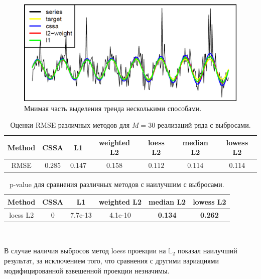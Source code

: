 \documentclass[specialist,
               substylefile = spbu.rtx,
               subf,href,colorlinks=true, 12pt]{disser}
\begin{document}
\begin{figure}[H]
	\begin{center}
		\includegraphics[width=0.67\linewidth]{img/analys_1_Im.png}
	\end{center}
	\caption{Мнимая часть выделения тренда несколькими способами.}
	\label{analys_Im_1}
\end{figure}

\begin{table}[H]
	\begin{center}
		\caption{Оценки RMSE различных методов для $M = 30$ реализаций ряда с выбросами.}
		\label{tab2}
		\begin{tabular}{|c|c|c|c|c|c|c|}
			\hline
			Method 	& CSSA & L1 & weighted L2 & loess L2 & median L2 & lowess L2 \\ 
			\hline
			RMSE & 0.285  & 0.147  & 0.158 & $\mathbf{0.112}$ & 0.114 & 0.114\\
			\hline
		\end{tabular}
	\end{center}
\end{table}

\begin{table}[H]
	\caption{p-value для сравнения различных методов с наилучшим с выбросами.}
	\label{tab: pval2}
	\begin{center}
		\begin{tabular}{|c|c|c|c|c|c|}
			\hline
			Method & CSSA	& L1 & weighted L2 & median L2 & lowess L2  \\ 
			\hline
			loess L2 & 0  & 7.7e-13 &   4.1e-10  &  \textbf{0.134} & \textbf{0.262}  \\
			\hline
		\end{tabular} \\
	\end{center}
\end{table}

В случае наличия выбросов метод loess проекции на $\mathbb{L}_2$ показал наилучший результат, за исключением того, что сравнения с другими вариациями модифицированной взвешенной проекции незначимы.
\end{document}
